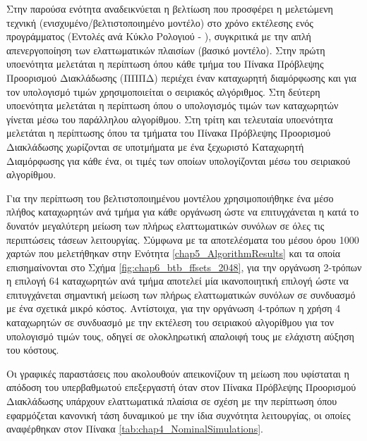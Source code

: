 Στην παρούσα ενότητα αναδεικνύεται η βελτίωση που προσφέρει η μελετώμενη τεχνική (ενισχυμένο/βελτιστοποιημένο μοντέλο) στο χρόνο εκτέλεσης ενός προγράμματος (Εντολές ανά Κύκλο Ρολογιού - \ipc), συγκριτικά με την απλή απενεργοποίηση των ελαττωματικών πλαισίων (βασικό μοντέλο). Στην πρώτη υποενότητα μελετάται η περίπτωση όπου κάθε τμήμα του Πίνακα Πρόβλεψης Προορισμού Διακλάδωσης (ΠΠΠΔ) περιέχει έναν καταχωρητή διαμόρφωσης και για τον υπολογισμό τιμών χρησιμοποιείται ο σειριακός αλγόριθμος. Στη δεύτερη υποενότητα μελετάται η περίπτωση όπου ο υπολογισμός τιμών των καταχωρητών γίνεται μέσω του παράλληλου αλγορίθμου. Στη τρίτη και τελευταία υποενότητα μελετάται η περίπτωσης όπου τα τμήματα του Πίνακα Πρόβλεψης Προορισμού Διακλάδωσης χωρίζονται σε υποτμήματα με ένα ξεχωριστό Καταχωρητή Διαμόρφωσης για κάθε ένα, οι τιμές των οποίων υπολογίζονται μέσω του σειριακού αλγορίθμου.
\par
Για την περίπτωση του βελτιστοποιημένου μοντέλου χρησιμοποιήθηκε ένα μέσο πλήθος καταχωρητών ανά τμήμα για κάθε οργάνωση ώστε να επιτυγχάνεται η κατά το δυνατόν μεγαλύτερη μείωση των πλήρως ελαττωματικών συνόλων σε όλες τις περιπτώσεις τάσεων λειτουργίας. Σύμφωνα με τα αποτελέσματα του μέσου όρου 1000 χαρτών που μελετήθηκαν στην Ενότητα \ref{chap5_AlgorithmResults} και τα οποία επισημαίνονται στο Σχήμα \ref{fig:chap6_btb_ffsets_2048}, για την οργάνωση 2-τρόπων η επιλογή 64 καταχωρητών ανά τμήμα αποτελεί μία ικανοποιητική επιλογή ώστε να επιτυγχάνεται σημαντική μείωση των πλήρως ελαττωματικών συνόλων σε συνδυασμό με ένα σχετικά μικρό κόστος. Αντίστοιχα, για την οργάνωση 4-τρόπων η χρήση 4 καταχωρητών σε συνδυασμό με την εκτέλεση του σειριακού αλγορίθμου για τον υπολογισμό τιμών τους, οδηγεί σε ολοκληρωτική απαλοιφή τους με ελάχιστη αύξηση του κόστους.
\par
Οι γραφικές παραστάσεις που ακολουθούν απεικονίζουν τη μείωση που υφίσταται η απόδοση του υπερβαθμωτού επεξεργαστή όταν στον Πίνακα Πρόβλεψης Προορισμού Διακλάδωσης υπάρχουν ελαττωματικά πλαίσια σε σχέση με την περίπτωση όπου εφαρμόζεται κανονική τάση δυναμικού με την ίδια συχνότητα λειτουργίας, οι οποίες αναφέρθηκαν στον Πίνακα \ref{tab:chap4_NominalSimulations}.

